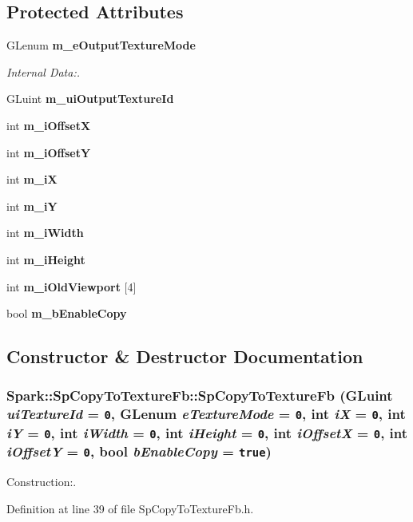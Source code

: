 \subsection*{Protected Attributes}
\begin{CompactItemize}
\item 
GLenum {\bf m\_\-e\-Output\-Texture\-Mode}
\begin{CompactList}\small\item\em Internal Data:. \item\end{CompactList}\item 
GLuint {\bf m\_\-ui\-Output\-Texture\-Id}
\item 
int {\bf m\_\-i\-Offset\-X}
\item 
int {\bf m\_\-i\-Offset\-Y}
\item 
int {\bf m\_\-i\-X}
\item 
int {\bf m\_\-i\-Y}
\item 
int {\bf m\_\-i\-Width}
\item 
int {\bf m\_\-i\-Height}
\item 
int {\bf m\_\-i\-Old\-Viewport} [4]
\item 
bool {\bf m\_\-b\-Enable\-Copy}
\end{CompactItemize}


\subsection{Constructor \& Destructor Documentation}
\subsubsection{\setlength{\rightskip}{0pt plus 5cm}Spark::Sp\-Copy\-To\-Texture\-Fb::Sp\-Copy\-To\-Texture\-Fb (GLuint {\em ui\-Texture\-Id} = {\tt 0}, GLenum {\em e\-Texture\-Mode} = {\tt 0}, int {\em i\-X} = {\tt 0}, int {\em i\-Y} = {\tt 0}, int {\em i\-Width} = {\tt 0}, int {\em i\-Height} = {\tt 0}, int {\em i\-Offset\-X} = {\tt 0}, int {\em i\-Offset\-Y} = {\tt 0}, bool {\em b\-Enable\-Copy} = {\tt true})\hspace{0.3cm}{\tt  [inline]}}\label{classSpark_1_1SpCopyToTextureFb_a0}


Construction:. 

Definition at line 39 of file Sp\-Copy\-To\-Texture\-Fb.h.

